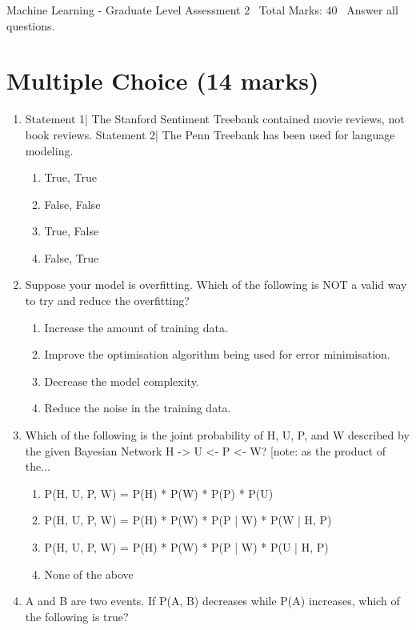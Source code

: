 \documentclass[12pt]{article}
\begin{document}
\begin{center}
Machine Learning - Graduate Level Assessment 2 \
Total Marks: 40 \
Answer all questions.
\end{center}

\section*{Multiple Choice (14 marks)}
\begin{enumerate}[label=\arabic*.]
\item Statement 1| The Stanford Sentiment Treebank contained movie reviews, not book reviews. Statement 2| The Penn Treebank has been used for language modeling.
\begin{enumerate}[label=(\alph*)]
    \item True, True
    \item False, False
    \item True, False
    \item False, True
\end{enumerate}
\item Suppose your model is overfitting. Which of the following is NOT a valid way to try and reduce the overfitting?
\begin{enumerate}[label=(\alph*)]
    \item Increase the amount of training data.
    \item Improve the optimisation algorithm being used for error minimisation.
    \item Decrease the model complexity.
    \item Reduce the noise in the training data.
\end{enumerate}
\item Which of the following is the joint probability of H, U, P, and W described by the given Bayesian Network H -> U <- P <- W? [note: as the product of the...
\begin{enumerate}[label=(\alph*)]
    \item P(H, U, P, W) = P(H) * P(W) * P(P) * P(U)
    \item P(H, U, P, W) = P(H) * P(W) * P(P | W) * P(W | H, P)
    \item P(H, U, P, W) = P(H) * P(W) * P(P | W) * P(U | H, P)
    \item None of the above
\end{enumerate}
\item A and B are two events. If P(A, B) decreases while P(A) increases, which of the following is true?

\end{enumerate}
\end{document}

